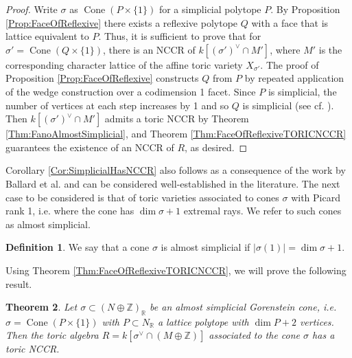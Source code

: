 \documentclass[reqno, 12pt]{amsart}
\newtheorem{theorem}{Theorem}[section]
\theoremstyle{definition}
\newtheorem{definition}[theorem]{Definition}
\numberwithin{equation}{section}
\newcommand{\newterm}{\textsf}
\newcommand{\Z}{\mathbb{Z}}
\newcommand{\R}{\mathbb{R}}
\newcommand{\cone}{\operatorname{Cone}}
\begin{document}
\begin{proof}
    Write $\sigma$ as $\cone(P\times\{1\})$ for a simplicial polytope $P$. By Proposition \ref{Prop:FaceOfReflexive} there exists a reflexive polytope $Q$ with a face that is lattice equivalent to $P$. Thus, it is sufficient to prove that for $\sigma'=\cone(Q\times\{1\})$, there is an NCCR of $k[(\sigma')^\vee\cap M']$, where $M'$ is the corresponding character lattice of the affine toric variety $X_{\sigma'}$. The proof of Proposition \ref{Prop:FaceOfReflexive} constructs $Q$ from $P$ by repeated application of the wedge construction over a codimension 1 facet. Since $P$ is simplicial, the number of vertices at each step increases by 1 and so $Q$ is simplicial (see cf. \cite[Chapter 15]{HandbookDiscrete}). Then $k[(\sigma')^\vee\cap M']$ admits a toric NCCR by Theorem \ref{Thm:FanoAlmostSimplicial}, and Theorem \ref{Thm:FaceOfReflexiveTORICNCCR} guarantees the existence of an NCCR of $R$, as desired.
\end{proof}

Corollary \ref{Cor:SimplicialHasNCCR} also follows as a consequence of the work by Ballard et al. \cite{BBB+} and can be considered well-established in the literature. The next case to be considered is that of toric varieties associated to cones $\sigma$ with Picard rank 1, i.e. where the cone has $\dim\sigma+1$ extremal rays. We refer to such cones as \newterm{almost simplicial}. 
\begin{definition}
    \label{Def:AlmSim}
    We say that a cone $\sigma$ is \newterm{almost simplicial} if $|\sigma(1)|=\dim \sigma+1$. 
\end{definition}

\noindent Using Theorem \ref{Thm:FaceOfReflexiveTORICNCCR}, we will prove the following result.
\begin{theorem}
    \label{Thm:AlmSim}
    Let $\sigma\subset (N\oplus \Z)_\R$ be an almost simplicial Gorenstein cone, i.e. $\sigma=\cone(P\times\{1\})$ with $P\subset N_\R$ a lattice polytope with $\dim P+2$ vertices. Then the toric algebra $R=k[\sigma^\vee\cap (M\oplus \Z)]$ associated to the cone $\sigma$ has a toric NCCR.
\end{theorem}
\end{document}
